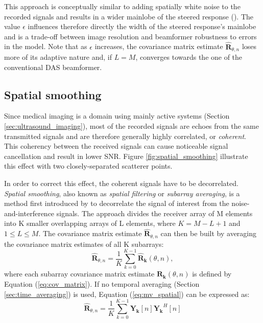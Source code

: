 This approach is conceptually similar to adding spatially white noise to the recorded signals and results in a wider mainlobe of the steered response (\cite{Synnevag_adaptive}). The value $\epsilon$ influences therefore directly the width of the steered response's mainlobe and is a trade-off between image resolution and beamformer robustness to errors in the model. Note that as $\epsilon$ increases, the covariance matrix estimate $\boldsymbol{\hat{R}}_{\theta, n}$ loses more of its adaptive nature and, if $L=M$, converges towards the one of the conventional DAS beamformer.

\subsection{Spatial smoothing}
\label{sec:spatial_smoothing}
Since medical imaging is a domain using mainly active systems (Section \ref{sec:ultrasound_imaging}), most of the recorded signals are echoes from the same transmitted signals and are therefore generally highly correlated, or \textit{coherent}. This coherency between the received signals can cause noticeable signal cancellation and result in lower SNR.
Figure \ref{fig:spatial_smoothing} illustrate this effect with two closely-separated scatterer points.

In order to correct this effect, the coherent signals have to be decorrelated. \textit{Spatial smoothing}, also known as \textit{spatial filtering} or \textit{subarray averaging}, is a method first introduced by \cite{Evans_spatial} to decorrelate the signal of interest from the noise-and-interference signals. The approach divides the receiver array of M elements into K smaller overlapping arrays of L elements, where $K = M - L + 1$ and $1 \leq L \leq M$. The covariance matrix estimate $\boldsymbol{\hat{R}}_{\theta, n}$ can then be built by averaging the covariance matrix estimates of all K subarrays:
\begin{equation}
    \boldsymbol{\hat{R}}_{\theta, n} = \frac{1}{K} \sum_{k=0}^{K-1} \boldsymbol{\hat{R}_k}(\theta, n),
\label{eq:mv_spatial}
\end{equation}
\noindent
where each subarray covariance matrix estimate $\boldsymbol{R_k}(\theta, n)$ is defined by Equation (\ref{eq:cov_matrix}). If no temporal averaging (Section \ref{sec:time_averaging}) is used, Equation (\ref{eq:mv_spatial}) can be expressed as:
\begin{equation}
    \boldsymbol{\hat{R}}_{\theta, n} = \frac{1}{K} \sum_{k=0}^{K-1} \boldsymbol{Y_k}[n] \boldsymbol{Y_k}^H[n]
\end{equation}
\noindent

